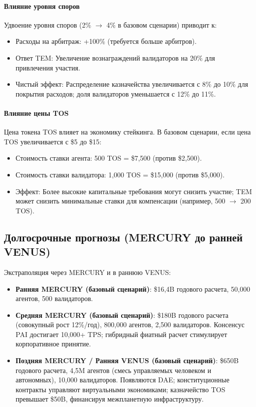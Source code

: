 \documentclass[11pt]{article}
\begin{document}
\paragraph{Влияние уровня споров}
Удвоение уровня споров (2\% $\to$ 4\% в базовом сценарии) приводит к:
\begin{itemize}[noitemsep]
  \item Расходы на арбитраж: +100\% (требуется больше арбитров).
  \item Ответ TEM: Увеличение вознаграждений валидаторов на 20\% для привлечения участия.
  \item Чистый эффект: Распределение казначейства увеличивается с 8\% до 10\% для покрытия расходов; доля валидаторов уменьшается с 12\% до 11\%.
\end{itemize}

\paragraph{Влияние цены TOS}
Цена токена TOS влияет на экономику стейкинга. В базовом сценарии, если цена TOS увеличивается с \$5 до \$15:
\begin{itemize}[noitemsep]
  \item Стоимость ставки агента: 500 TOS = \$7{,}500 (против \$2{,}500).
  \item Стоимость ставки валидатора: 1{,}000 TOS = \$15{,}000 (против \$5{,}000).
  \item Эффект: Более высокие капитальные требования могут снизить участие; TEM может снизить минимальные ставки для компенсации (например, 500 $\to$ 200 TOS).
\end{itemize}

\subsection{Долгосрочные прогнозы (MERCURY до ранней VENUS)}
Экстраполяция через MERCURY и в раннюю VENUS:
\begin{itemize}[noitemsep]
  \item \textbf{Ранняя MERCURY (базовый сценарий)}: \$16,4B годового расчета, 50{,}000 агентов, 500 валидаторов.
  \item \textbf{Средняя MERCURY (базовый сценарий)}: \$180B годового расчета (совокупный рост 12\%/год), 800{,}000 агентов, 2{,}500 валидаторов. Консенсус PAI достигает 10{,}000+ TPS; гибридный фиатный расчет стимулирует корпоративное принятие.
  \item \textbf{Поздняя MERCURY / Ранняя VENUS (базовый сценарий)}: \$650B годового расчета, 4,5M агентов (смесь управляемых человеком и автономных), 10{,}000 валидаторов. Появляются DAE; конституционные контракты управляют виртуальными экономиками; казначейство TOS превышает \$50B, финансируя межпланетную инфраструктуру.
\end{itemize}
\end{document}
